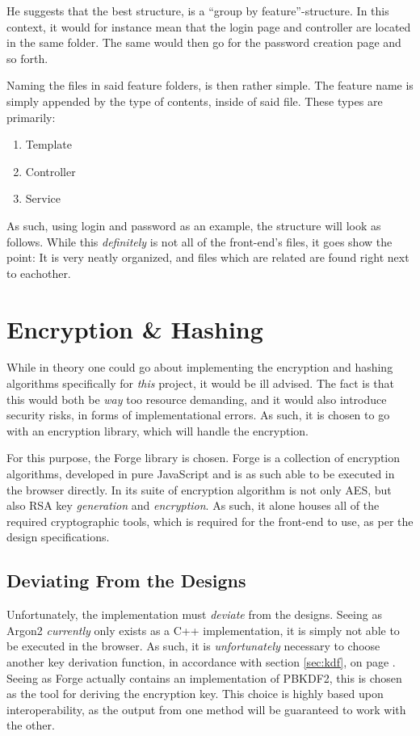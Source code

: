 		He suggests that the best structure, is a ``group by feature''-structure. In this context, it would for instance mean that the login page and controller are located in the same folder. The same would then go for the password creation page and so forth.

		Naming the files in said feature folders, is then rather simple. The feature name is simply appended by the type of contents, inside of said file. These types are primarily:
		\begin{enumerate}
			\item Template
			\item Controller
			\item Service
		\end{enumerate}
		As such, using login and password as an example, the structure will look as follows. While this \emph{definitely} is not all of the front-end's files, it goes show the point: It is very neatly organized, and files which are related are found right next to eachother.


	\section{Encryption \& Hashing}
		While in theory one could go about implementing the encryption and hashing algorithms specifically for \emph{this} project, it would be ill advised. The fact is that this would both be \emph{way} too resource demanding, and it would also introduce security risks, in forms of implementational errors. As such, it is chosen to go with an encryption library, which will handle the encryption.

		For this purpose, the Forge library is chosen\cite{forge-encryption}. Forge is a collection of encryption algorithms, developed in pure JavaScript and is as such able to be executed in the browser directly. In its suite of encryption algorithm is not only AES, but also RSA key \emph{generation} and \emph{encryption}. As such, it alone houses all of the required cryptographic tools, which is required for the front-end to use, as per the design specifications.

		\subsection{Deviating From the Designs}
			Unfortunately, the implementation must \emph{deviate} from the designs. Seeing as Argon2 \emph{currently} only exists as a C++ implementation, it is simply not able to be executed in the browser. As such, it is \emph{unfortunately} necessary to choose another key derivation function, in accordance with section \ref{sec:kdf}, on page \pageref{sec:kdf}. Seeing as Forge actually contains an implementation of PBKDF2, this is chosen as the tool for deriving the encryption key. This choice is highly based upon interoperability, as the output from one method will be guaranteed to work with the other.

